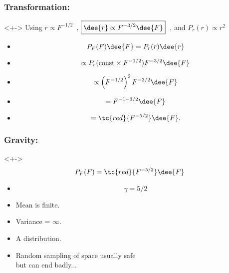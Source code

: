 
\begin{frame}
  \frametitle{Transformation:}

  \begin{block}<+->{}
    Using
    $\boxed{r \propto F^{-1/2}}$\ ,
    $\boxed{\dee{r} \propto F^{-3/2} \dee{F}}$\ ,
    and
    $\boxed{P_r(r) \propto r^{2}}$
    \begin{itemize}
    \item<+-> 
      $$ P_F(F)\dee{F} = P_r(r) \dee{r} $$
    \item<+-> 
      $$  \propto P_r(\mbox{const} \times F^{-1/2}) F^{-3/2} \dee{F} $$
    \item<+-> 
      $$ \propto \left(F^{-1/2}\right)^{2}  F^{-3/2} \dee{F} $$
    \item<+-> 
      $$ = F^{-1 -3/2} \dee{F} $$
    \item<+-> 
      $$ = \tc{red}{F^{-5/2}} \dee{F}. $$
    \end{itemize}
  \end{block}

\end{frame}

\begin{frame}
  \frametitle{Gravity:}

  \begin{block}<+->{$$ P_F(F) = \tc{red}{F^{-5/2}} \dee{F} $$}
  \begin{itemize}
  \item<+->   
    $$ \gamma = 5/2 $$
  \item<+-> 
    Mean is finite.
  \item<+-> 
    Variance = $\infty$.
  \item<+-> 
    A  distribution.
  \item<+-> 
     Random sampling of space usually safe\\
    but can end badly...
  \end{itemize}
  \end{block}

\end{frame}

